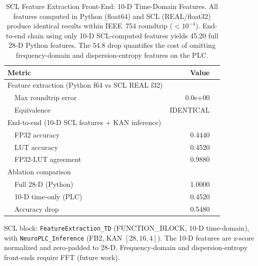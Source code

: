 \begin{table}[t]
\centering
\caption{SCL Feature Extraction Front-End: 10-D Time-Domain Features.
All features computed in Python (float64) and SCL (REAL/float32) produce
identical results within IEEE~754 roundtrip ($<10^{-4}$).
End-to-end chain using only 10-D SCL-computed features yields 45.20%
full 28-D Python features. The 54.8%
drop quantifies the cost of omitting frequency-domain and dispersion-entropy
features on the PLC.}
\label{tab:scl_feature_frontend}
\small
\begin{tabular}{@{}lrr@{}}
\toprule
\textbf{Metric} & \textbf{Value} \\
\midrule
Feature extraction (Python f64 vs SCL REAL f32) & \\
~~Max roundtrip error & 0.0e+00 \\
~~Equivalence & IDENTICAL \\
\midrule
End-to-end (10-D SCL features $+$ KAN inference) & \\
~~FP32 accuracy & 0.4440 \\
~~LUT accuracy & 0.4520 \\
~~FP32-LUT agreement & 0.9880 \\
\midrule
Ablation comparison & \\
~~Full 28-D (Python) & 1.0000 \\
~~10-D time-only (PLC) & 0.4520 \\
~~Accuracy drop & 0.5480 \\
\bottomrule
\end{tabular}
\vspace{2pt}
{\scriptsize SCL block: \texttt{FeatureExtraction\_TD} (FUNCTION\_BLOCK, 10-D
time-domain), with \texttt{NeuroPLC\_Inference} (FB2, KAN $[28,16,4]$).
The 10-D features are z-score normalized and zero-padded to 28-D.
Frequency-domain and dispersion-entropy front-ends require FFT (future work).}
\end{table}